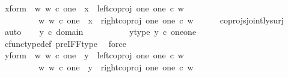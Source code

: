 \begin{isabellebody}
\ x{\isacharunderscore}{\kern0pt}form{\isacharcolon}{\kern0pt}\ {\isachardoublequoteopen}{\isacharparenleft}{\kern0pt}{\isasymexists}\ w{\isachardot}{\kern0pt}\ {\isacharparenleft}{\kern0pt}w\ {\isasymin}\isactrlsub c\ one\ {\isasymand}\ x\ {\isacharequal}{\kern0pt}\ {\isacharparenleft}{\kern0pt}left{\isacharunderscore}{\kern0pt}coproj\ one\ one{\isacharparenright}{\kern0pt}\ {\isasymcirc}\isactrlsub c\ w{\isacharparenright}{\kern0pt}{\isacharparenright}{\kern0pt}\isanewline
\ \ \ \ \ \ {\isasymor}\ \ {\isacharparenleft}{\kern0pt}{\isasymexists}\ w{\isachardot}{\kern0pt}\ {\isacharparenleft}{\kern0pt}w\ {\isasymin}\isactrlsub c\ one\ {\isasymand}\ x\ {\isacharequal}{\kern0pt}\ {\isacharparenleft}{\kern0pt}right{\isacharunderscore}{\kern0pt}coproj\ one\ one{\isacharparenright}{\kern0pt}\ {\isasymcirc}\isactrlsub c\ w{\isacharparenright}{\kern0pt}{\isacharparenright}{\kern0pt}{\isachardoublequoteclose}\isanewline
\ \ \ \ \isamarkupfalse%
\ coprojs{\isacharunderscore}{\kern0pt}jointly{\isacharunderscore}{\kern0pt}surj\ \isamarkupfalse%
\ auto\isanewline
\isanewline
\ \ \isamarkupfalse%
\ {\isachardoublequoteopen}y\ {\isasymin}\isactrlsub c\ domain\ {\isacharparenleft}{\kern0pt}{\isasymlangle}{\isasymt}{\isacharcomma}{\kern0pt}\ {\isasymt}{\isasymrangle}\ {\isasymamalg}{\isasymlangle}{\isasymf}{\isacharcomma}{\kern0pt}\ {\isasymf}{\isasymrangle}{\isacharparenright}{\kern0pt}{\isachardoublequoteclose}\ \isanewline
\ \ \isamarkupfalse%
\ \isamarkupfalse%
\ y{\isacharunderscore}{\kern0pt}type{\isacharcolon}{\kern0pt}\ {\isachardoublequoteopen}y\ {\isasymin}\isactrlsub c\ {\isacharparenleft}{\kern0pt}one{\isasymCoprod}one{\isacharparenright}{\kern0pt}{\isachardoublequoteclose}\ \ \isanewline
\ \ \ \ \isamarkupfalse%
\ cfunc{\isacharunderscore}{\kern0pt}type{\isacharunderscore}{\kern0pt}def\ pre{\isacharunderscore}{\kern0pt}IFF{\isacharunderscore}{\kern0pt}type\ \isamarkupfalse%
\ force\isanewline
\ \ \isamarkupfalse%
\ \isamarkupfalse%
\ y{\isacharunderscore}{\kern0pt}form{\isacharcolon}{\kern0pt}\ {\isachardoublequoteopen}{\isacharparenleft}{\kern0pt}{\isasymexists}\ w{\isachardot}{\kern0pt}\ {\isacharparenleft}{\kern0pt}w\ {\isasymin}\isactrlsub c\ one\ {\isasymand}\ y\ {\isacharequal}{\kern0pt}\ {\isacharparenleft}{\kern0pt}left{\isacharunderscore}{\kern0pt}coproj\ one\ one{\isacharparenright}{\kern0pt}\ {\isasymcirc}\isactrlsub c\ w{\isacharparenright}{\kern0pt}{\isacharparenright}{\kern0pt}\isanewline
\ \ \ \ \ \ {\isasymor}\ \ {\isacharparenleft}{\kern0pt}{\isasymexists}\ w{\isachardot}{\kern0pt}\ {\isacharparenleft}{\kern0pt}w\ {\isasymin}\isactrlsub c\ one\ {\isasymand}\ y\ {\isacharequal}{\kern0pt}\ {\isacharparenleft}{\kern0pt}right{\isacharunderscore}{\kern0pt}coproj\ one\ one{\isacharparenright}{\kern0pt}\ {\isasymcirc}\isactrlsub c\ w{\isacharparenright}{\kern0pt}{\isacharparenright}{\kern0pt}{\isachardoublequoteclose}\isanewline

\end{isabellebody}
